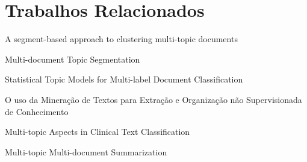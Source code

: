 \section{Trabalhos Relacionados}



A segment-based approach to clustering multi-topic documents~\cite{Tagarelli2013}

Multi-document Topic Segmentation~\cite{Jeong:2010}

Statistical Topic Models for Multi-label Document Classification~\cite{Rubin:2012}

O uso da Mineração de Textos para Extração e Organização não Supervisionada de Conhecimento~\cite{Rezende2011}

Multi-topic Aspects in Clinical Text Classification~\cite{Sasaki:2007}

Multi-topic Multi-document Summarization~\cite{Masao:2000}


